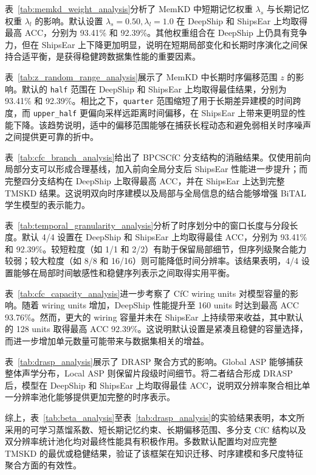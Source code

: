 \documentclass[a4paper, 12pt]{article}
\begin{document}
表~\ref{tab:memkd_weight_analysis}分析了 MemKD 中短期记忆权重 $\lambda_s$ 与长期记忆权重 $\lambda_l$ 的影响。默认设置 $\lambda_s=0.50,\lambda_l=1.0$ 在 DeepShip 和 ShipsEar 上均取得最高 ACC，分别为 93.41\% 和 92.39\%。其他权重组合在 DeepShip 上仍具有竞争力，但在 ShipsEar 上下降更加明显，说明在短期局部变化和长期时序演化之间保持合适平衡，是获得稳健跨数据集性能的重要因素。

表~\ref{tab:z_random_range_analysis}展示了 MemKD 中长期时序偏移范围 $z$ 的影响。默认的 \texttt{half} 范围在 DeepShip 和 ShipsEar 上均取得最佳结果，分别为 93.41\% 和 92.39\%。相比之下，\texttt{quarter} 范围缩短了用于长期差异建模的时间跨度，而 \texttt{upper\_half} 更偏向采样远距离时间偏移，在 ShipsEar 上带来更明显的性能下降。该趋势说明，适中的偏移范围能够在捕获长程动态和避免弱相关时序噪声之间提供更可靠的折中。

表~\ref{tab:cfc_branch_analysis}给出了 BPCSCfC 分支结构的消融结果。仅使用前向局部分支可以形成合理基线，加入前向全局分支后 ShipsEar 性能进一步提升；而完整四分支结构在 DeepShip 上取得最高 ACC，并在 ShipsEar 上达到完整 TMSKD 结果。这说明双向时序建模以及局部与全局信息的结合能够增强 BiTAL 学生模型的表示能力。

表~\ref{tab:temporal_granularity_analysis}分析了时序划分中的窗口长度与分段长度。默认 4/4 设置在 DeepShip 和 ShipsEar 上均取得最佳 ACC，分别为 93.41\% 和 92.39\%。较短粒度（如 1/1 和 2/2）有助于保留局部细节，但序列级聚合能力较弱；较大粒度（如 8/8 和 16/16）则可能降低时间分辨率。该结果表明，4/4 设置能够在局部时间敏感性和稳健序列表示之间取得实用平衡。

表~\ref{tab:cfc_capacity_analysis}进一步考察了 CfC wiring units 对模型容量的影响。随着 wiring units 增加，DeepShip 性能提升至 160 units 时达到最高 ACC 93.76\%。然而，更大的 wiring 容量并未在 ShipsEar 上持续带来收益，其中默认的 128 units 取得最高 ACC 92.39\%。这说明默认设置是紧凑且稳健的容量选择，而进一步增加单元数量可能带来与数据集相关的增益。

表~\ref{tab:drasp_analysis}展示了 DRASP 聚合方式的影响。Global ASP 能够捕获整体声学分布，Local ASP 则保留片段级时间细节。将二者结合形成 DRASP 后，模型在 DeepShip 和 ShipsEar 上均取得最佳 ACC，说明双分辨率聚合相比单一分辨率池化能够提供更加完整的时序表示。

综上，表~\ref{tab:beta_analysis}至表~\ref{tab:drasp_analysis}的实验结果表明，本文所采用的可学习蒸馏系数、短长期记忆约束、长期偏移范围、多分支 CfC 结构以及双分辨率统计池化均对最终性能具有积极作用。多数默认配置均对应完整 TMSKD 的最优或稳健结果，验证了该框架在知识迁移、时序建模和多尺度特征聚合方面的有效性。
\end{document}
